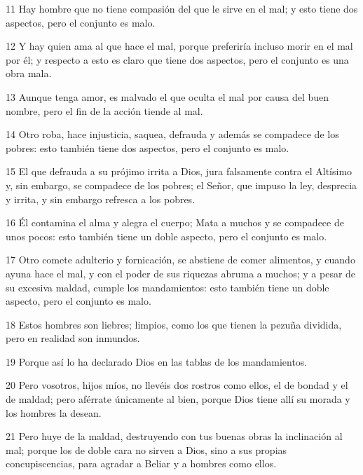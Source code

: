\par 11 Hay hombre que no tiene compasión del que le sirve en el mal; y esto tiene dos aspectos, pero el conjunto es malo.

\par 12 Y hay quien ama al que hace el mal, porque preferiría incluso morir en el mal por él; y respecto a esto es claro que tiene dos aspectos, pero el conjunto es una obra mala.

\par 13 Aunque tenga amor, es malvado el que oculta el mal por causa del buen nombre, pero el fin de la acción tiende al mal.

\par 14 Otro roba, hace injusticia, saquea, defrauda y además se compadece de los pobres: esto también tiene dos aspectos, pero el conjunto es malo.

\par 15 El que defrauda a su prójimo irrita a Dios, jura falsamente contra el Altísimo y, sin embargo, se compadece de los pobres; el Señor, que impuso la ley, desprecia y irrita, y sin embargo refresca a los pobres.

\par 16 Él contamina el alma y alegra el cuerpo; Mata a muchos y se compadece de unos pocos: esto también tiene un doble aspecto, pero el conjunto es malo.

\par 17 Otro comete adulterio y fornicación, se abstiene de comer alimentos, y cuando ayuna hace el mal, y con el poder de sus riquezas abruma a muchos; y a pesar de su excesiva maldad, cumple los mandamientos: esto también tiene un doble aspecto, pero el conjunto es malo.

\par 18 Estos hombres son liebres; limpios, como los que tienen la pezuña dividida, pero en realidad son inmundos.

\par 19 Porque así lo ha declarado Dios en las tablas de los mandamientos.

\par 20 Pero vosotros, hijos míos, no llevéis dos rostros como ellos, el de bondad y el de maldad; pero aférrate únicamente al bien, porque Dios tiene allí su morada y los hombres la desean.

\par 21 Pero huye de la maldad, destruyendo con tus buenas obras la inclinación al mal; porque los de doble cara no sirven a Dios, sino a sus propias concupiscencias, para agradar a Beliar y a hombres como ellos.

